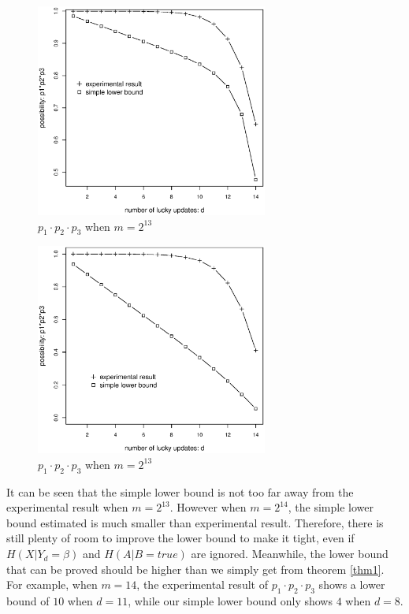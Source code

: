 \documentclass[10pt, conference, compsocconf]{IEEEtran}
\begin{document}
		\begin{figure}[!t]
		\centering
		\includegraphics[width=3in, trim=0mm 0mm 0mm 20mm]{p13.eps}
		\caption{$p_1 \cdot p_2 \cdot p_3$ when $m = 2^{13}$}\label{p13}
		\end{figure}

		\begin{figure}[!t]
		\centering
		\includegraphics[width=3in, trim=0mm 0mm 0mm 20mm]{p14.eps}
		\caption{$p_1 \cdot p_2 \cdot p_3$ when $m = 2^{13}$}\label{p14}
		\end{figure}
		
		It can be seen that the simple lower bound is not too
		far away from the experimental result when $m = 2^{13}$.		
		However when $m = 2^{14}$, the simple lower bound
		estimated is much smaller than experimental result. Therefore,
		there is still plenty of room to improve the lower bound
		to make it tight, even if $H(X | Y_d = \beta)$ and $H(A | B = true)$ 
		are ignored. Meanwhile, the lower bound that can be proved should
		be higher than we simply get from theorem \ref{thm1}.
		For example, when $m = 14$, the experimental result
		of $p_1 \cdot p_2 \cdot p_3$ shows a lower bound of $10$
		when $d = 11$, while our simple lower bound only shows $4$
		when $d = 8$.
		
\end{document}
